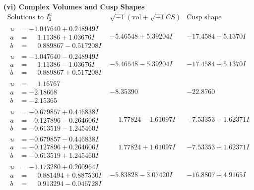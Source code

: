 \documentclass[1p]{elsarticle_modified}
\theoremstyle{definition}
\newcommand{\I}{\sqrt{-1}}
\begin{document}
\newpage\flushleft \textbf{(vi) Complex Volumes and Cusp Shapes}
$$\begin{array}{c|c|c}  
\text{Solutions to }I^u_{2}& \I (\text{vol} + \sqrt{-1}CS) & \text{Cusp shape}\\
 \hline 
\begin{aligned}
u &= -1.047640 + 0.248949 I \\
a &= \phantom{-}1.11386 + 1.03676 I \\
b &= \phantom{-}0.889867 - 0.517208 I\end{aligned}
 & -5.46548 + 5.39204 I & -17.4584 - 5.1370 I \\ \hline\begin{aligned}
u &= -1.047640 - 0.248949 I \\
a &= \phantom{-}1.11386 - 1.03676 I \\
b &= \phantom{-}0.889867 + 0.517208 I\end{aligned}
 & -5.46548 - 5.39204 I & -17.4584 + 5.1370 I \\ \hline\begin{aligned}
u &= \phantom{-}1.16767\phantom{ +0.000000I} \\
a &= -2.18668\phantom{ +0.000000I} \\
b &= -2.15365\phantom{ +0.000000I}\end{aligned}
 & -8.35390\phantom{ +0.000000I} & -22.8760\phantom{ +0.000000I} \\ \hline\begin{aligned}
u &= -0.679857 + 0.446838 I \\
a &= -0.127896 - 0.264606 I \\
b &= -0.613519 - 1.245460 I\end{aligned}
 & \phantom{-}1.77824 - 1.61097 I & -7.53353 - 1.62371 I \\ \hline\begin{aligned}
u &= -0.679857 - 0.446838 I \\
a &= -0.127896 + 0.264606 I \\
b &= -0.613519 + 1.245460 I\end{aligned}
 & \phantom{-}1.77824 + 1.61097 I & -7.53353 + 1.62371 I \\ \hline\begin{aligned}
u &= -1.173280 + 0.260964 I \\
a &= \phantom{-}0.881494 + 0.887530 I \\
b &= \phantom{-}0.913294 - 0.046728 I\end{aligned}
 & -5.83828 - 3.07420 I & -16.8807 + 4.9165 I \\ \hline\begin{aligned}

\end{aligned}
\end{array}$$
\end{document}
